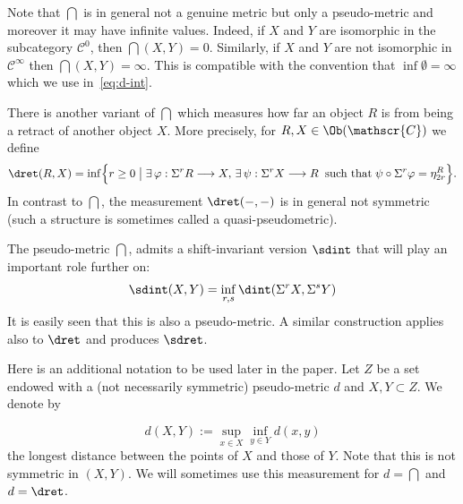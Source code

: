 Note that $\dint$ is in general not a genuine metric but only a
pseudo-metric and moreover it may have infinite values. Indeed, if $X$
and $Y$ are isomorphic in the subcategory $\mathscr{C}^0$, then
$\dint(X, Y) = 0$. Similarly, if $X$ and $Y$ are not isomorphic in
$\mathscr{C}^{\infty}$ then $\dint(X,Y) = \infty$. This is compatible
with the convention that $\inf \emptyset = \infty$ which we use
in~\eqref{eq:d-int}.

There is another variant of $\dint$ which measures how far an object
$R$ is from being a retract of another object $X$. More precisely, for
$R, X \in \Ob(\mathscr{C})$ we define
\begin{equation} \label{eq:d-rint} \dret(R,X) = \inf \Bigl\{r \geq 0
  \bigm| \exists \, \varphi: \Sigma^rR \longrightarrow X, \, \exists
  \, \psi: \Sigma^rX
  \longrightarrow R \\
  \;\; \text{such that} \; \psi \circ \Sigma^r \varphi = \eta_{2r}^R
  \Bigr\}.
\end{equation}
In contrast to $\dint$, the measurement $\dret(-,-)$ is in general not
symmetric (such a structure is sometimes called a quasi-pseudometric).

The pseudo-metric $\dint$, admits a shift-invariant version $\sdint$ that will play 
an important role further on:
\begin{equation}\label{eq:sdint}
\sdint (X,Y)=\inf_{r,s} \dint (\Sigma^{r}X,\Sigma^{s}Y)
\end{equation}
It is easily seen that this is also a pseudo-metric. A similar
construction applies also to $\dret$ and produces $\sdret$.


Here is an additional notation to be used later in the paper. Let $Z$
be a set endowed with a (not necessarily symmetric) pseudo-metric $d$
and $X, Y \subset Z$. We denote by

$$d(X,Y) := \sup_{x \in X} \inf_{y \in Y} d(x,y)$$
the longest distance
between the points of $X$ and those of $Y$. 
Note that this is not symmetric in $(X,Y)$.
We will sometimes use this measurement for $d=\dint$  and $d=\dret$.


